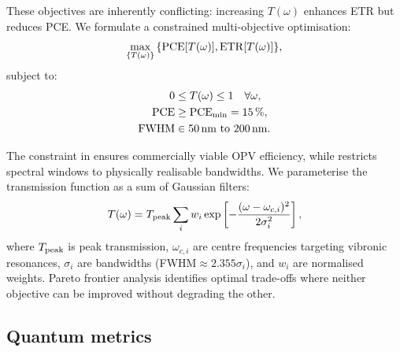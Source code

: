 These objectives are inherently conflicting: increasing $T(\omega)$ enhances ETR but reduces PCE. We formulate a constrained multi-objective optimisation:
\begin{equation}\label{eq:pareto_optimization}
\max_{\{T(\omega)\}} \qty{ \mathrm{PCE}[T(\omega)], \mathrm{ETR}[T(\omega)] },
\end{equation}
subject to:
\begin{align}
0 &\leq T(\omega) \leq 1 \quad \forall \omega, \label{eq:constraint1}\\
\mathrm{PCE} &\geq \mathrm{PCE}_{\rm min} = \SI{15}{\percent}, \label{eq:constraint2}\\
\mathrm{FWHM} &\in \SIrange{50}{200}{\nano\meter}. \label{eq:constraint3}
\end{align}

The constraint in  ensures commercially viable OPV efficiency, while  restricts spectral windows to physically realisable bandwidths. We parameterise the transmission function as a sum of Gaussian filters:
\begin{equation}\label{eq:transmission_function}
T(\omega) = T_{\rm peak} \sum_i w_i \exp\left[-\frac{(\omega - \omega_{c,i})^2}{2\sigma_i^2}\right],
\end{equation}
where $T_{\rm peak}$ is peak transmission, $\omega_{c,i}$ are centre frequencies targeting vibronic resonances, $\sigma_i$ are bandwidths (FWHM$\approx 2.355\sigma_i$), and $w_i$ are normalised weights. Pareto frontier analysis identifies optimal trade-offs where neither objective can be improved without degrading the other.

\subsection{Quantum metrics}

